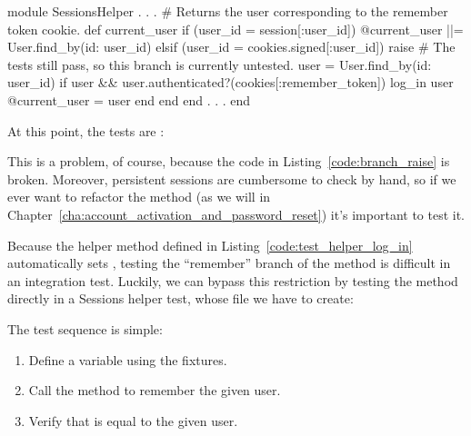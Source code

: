 \begin{codelisting}
\label{code:branch_raise}
\begin{code}
module SessionsHelper
  .
  .
  .
  # Returns the user corresponding to the remember token cookie.
  def current_user
    if (user_id = session[:user_id])
      @current_user ||= User.find_by(id: user_id)
    elsif (user_id = cookies.signed[:user_id])
      raise       # The tests still pass, so this branch is currently untested.
      user = User.find_by(id: user_id)
      if user && user.authenticated?(cookies[:remember_token])
        log_in user
        @current_user = user
      end
    end
  end
  .
  .
  .
end
\end{code}
\end{codelisting}

\noindent At this point, the tests are \passing:


\noindent This is a problem, of course, because the code in Listing~\ref{code:branch_raise} is broken. Moreover, persistent sessions are cumbersome to check by hand, so if we ever want to refactor the  method (as we will in Chapter~\ref{cha:account_activation_and_password_reset}) it's important to test it.


Because the  helper method defined in Listing~\ref{code:test_helper_log_in} automatically sets , testing the ``remember'' branch of the  method is difficult in an integration test. Luckily, we can bypass this restriction by testing the  method directly in a Sessions helper test, whose file we have to create:


\noindent The test sequence is simple:

\begin{enumerate}
\item Define a  variable using the fixtures.
\item Call the  method to remember the given user.
\item Verify that  is equal to the given user.
\end{enumerate}

